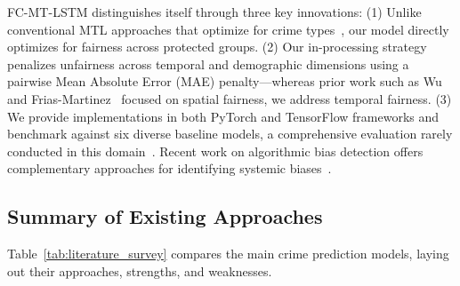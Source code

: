\documentclass[conference]{IEEEtran}
\begin{document}
FC-MT-LSTM distinguishes itself through three key innovations: (1) Unlike conventional MTL approaches that optimize for crime types~\cite{patel2023multi}, our model directly optimizes for fairness across protected groups. (2) Our in-processing strategy penalizes unfairness across temporal and demographic dimensions using a pairwise Mean Absolute Error (MAE) penalty---whereas prior work such as Wu and Frias-Martinez~\cite{wu2024improving} focused on spatial fairness, we address temporal fairness. (3) We provide implementations in both PyTorch and TensorFlow frameworks and benchmark against six diverse baseline models, a comprehensive evaluation rarely conducted in this domain~\cite{mohammadi2023survey, wang2023fairness}. Recent work on algorithmic bias detection offers complementary approaches for identifying systemic biases~\cite{reddy2024algorithmic}.

\subsection{Summary of Existing Approaches}

Table~\ref{tab:literature_survey} compares the main crime prediction models, laying out their approaches, strengths, and weaknesses.
\end{document}
